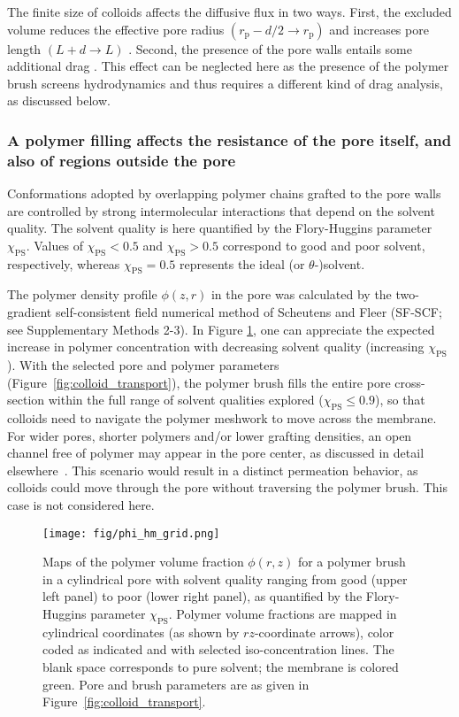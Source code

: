 \documentclass[12pt, a4paper]{article}
\begin{document}
The finite size of colloids affects the diffusive flux in two ways.
First, the excluded volume reduces the effective pore radius $(r_{\text{p}} - d/2\rightarrow r_{\text{p}})$ and increases pore length $(L + d \rightarrow L)$ \cite{Renkin1954, Beck1970, Bungay1973, Anderson1974, Brenner1977}.
Second, the presence of the pore walls entails some additional drag \cite{Ladenburg1907, Faxen1922, Haberman1958}.
This effect can be neglected here as the presence of the polymer brush screens hydrodynamics and thus requires a different kind of drag analysis, as discussed below.


\subsubsection{A polymer filling affects the resistance of the pore itself, and also of regions outside the pore}

Conformations adopted by overlapping polymer chains grafted to the pore walls are controlled by strong intermolecular interactions that depend on the solvent quality.
The solvent quality is here quantified by the Flory-Huggins parameter $\chi_{\text{PS}}$.
Values of $\chi_{\text{PS}}<0.5$ and $\chi_{\text{PS}}>0.5$ correspond to good and poor solvent, respectively, whereas $\chi_{\text{PS}}=0.5$ represents the ideal (or $\theta$-)solvent.

The polymer density profile $\phi(z,r)$ in the pore was calculated by the two-gradient self-consistent field numerical method of Scheutens and Fleer (SF-SCF; see Supplementary Methods 2-3).
In Figure \ref{fig:phi_hm_grid}, one can appreciate the expected increase in polymer concentration with decreasing solvent quality (increasing $\chi_{\text{PS}}$).
With the selected pore and polymer parameters (Figure~\ref{fig:colloid_transport}), the polymer brush fills the entire pore cross-section within the full range of solvent qualities explored ($\chi_{\text{PS}}\le0.9$), so that colloids need to navigate the polymer meshwork to move across the membrane.
For wider pores, shorter polymers and/or lower grafting densities, an open channel free of polymer may appear in the pore center, as discussed in detail elsewhere~\cite{Laktionov2021}.
This scenario would result in a distinct permeation behavior, as colloids could move through the pore without traversing the polymer brush.
This case is not considered here.

\begin{figure}
    \centering
    \texttt{[image: fig/phi\_hm\_grid.png]}
    \caption{
    Maps of the polymer volume fraction $\phi(r,z)$ for a polymer brush in a cylindrical pore with solvent quality ranging from good (upper left panel) to poor (lower right panel), as quantified by the Flory-Huggins parameter $\chi_{\text{PS}}$.
    Polymer volume fractions are mapped in cylindrical coordinates (as shown by $rz$-coordinate arrows), color coded as indicated and with selected iso-concentration lines. The blank space corresponds to pure solvent; the membrane is colored green.
    Pore and brush parameters are as given in Figure~\ref{fig:colloid_transport}.
    }
    \label{fig:phi_hm_grid}
\end{figure}
\end{document}
